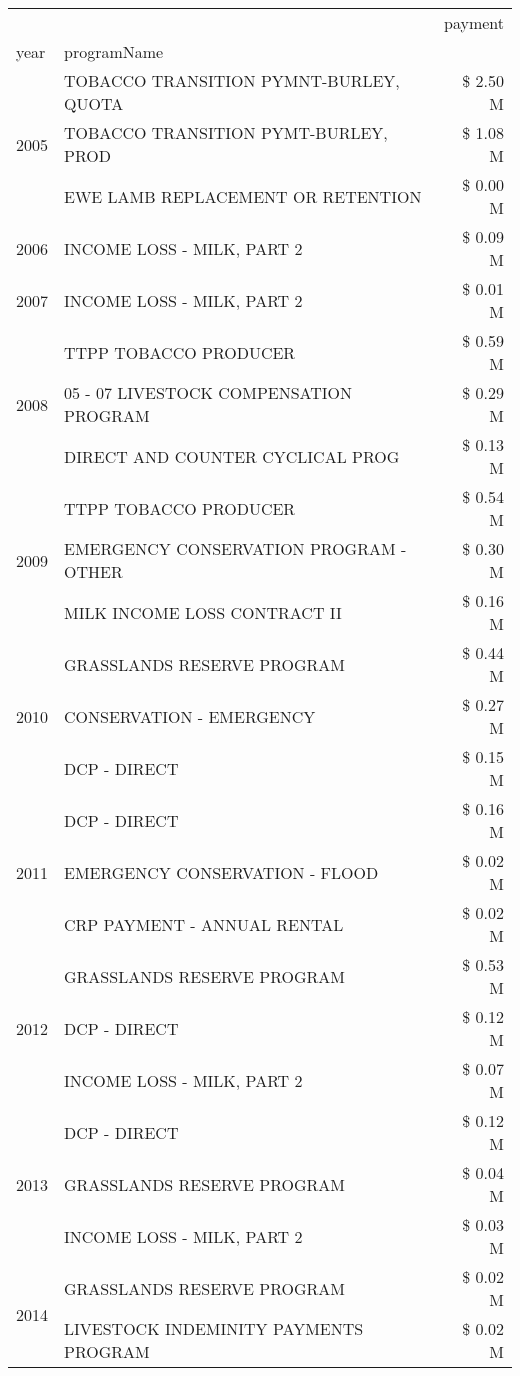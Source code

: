 \begin{tabular}{llr}
\toprule
 &  & payment \\
year & programName &  \\
\midrule
\multirow[t]{3}{*}{2005} & TOBACCO TRANSITION PYMNT-BURLEY, QUOTA & \$ 2.50 M \\
 & TOBACCO TRANSITION PYMT-BURLEY, PROD & \$ 1.08 M \\
 & EWE LAMB REPLACEMENT OR RETENTION & \$ 0.00 M \\
\cline{1-3}
2006 & INCOME LOSS - MILK, PART 2 & \$ 0.09 M \\
\cline{1-3}
2007 & INCOME LOSS - MILK, PART 2 & \$ 0.01 M \\
\cline{1-3}
\multirow[t]{3}{*}{2008} & TTPP TOBACCO PRODUCER & \$ 0.59 M \\
 & 05 - 07 LIVESTOCK COMPENSATION PROGRAM & \$ 0.29 M \\
 & DIRECT AND COUNTER CYCLICAL PROG & \$ 0.13 M \\
\cline{1-3}
\multirow[t]{3}{*}{2009} & TTPP TOBACCO PRODUCER & \$ 0.54 M \\
 & EMERGENCY CONSERVATION PROGRAM - OTHER & \$ 0.30 M \\
 & MILK INCOME LOSS CONTRACT II & \$ 0.16 M \\
\cline{1-3}
\multirow[t]{3}{*}{2010} & GRASSLANDS RESERVE PROGRAM & \$ 0.44 M \\
 & CONSERVATION - EMERGENCY & \$ 0.27 M \\
 & DCP - DIRECT & \$ 0.15 M \\
\cline{1-3}
\multirow[t]{3}{*}{2011} & DCP - DIRECT & \$ 0.16 M \\
 & EMERGENCY CONSERVATION - FLOOD & \$ 0.02 M \\
 & CRP PAYMENT - ANNUAL RENTAL & \$ 0.02 M \\
\cline{1-3}
\multirow[t]{3}{*}{2012} & GRASSLANDS RESERVE PROGRAM & \$ 0.53 M \\
 & DCP - DIRECT & \$ 0.12 M \\
 & INCOME LOSS - MILK, PART 2 & \$ 0.07 M \\
\cline{1-3}
\multirow[t]{3}{*}{2013} & DCP - DIRECT & \$ 0.12 M \\
 & GRASSLANDS RESERVE PROGRAM & \$ 0.04 M \\
 & INCOME LOSS - MILK, PART 2 & \$ 0.03 M \\
\cline{1-3}
\multirow[t]{3}{*}{2014} & GRASSLANDS RESERVE PROGRAM & \$ 0.02 M \\
 & LIVESTOCK INDEMINITY PAYMENTS PROGRAM & \$ 0.02 M \\

\end{tabular}
